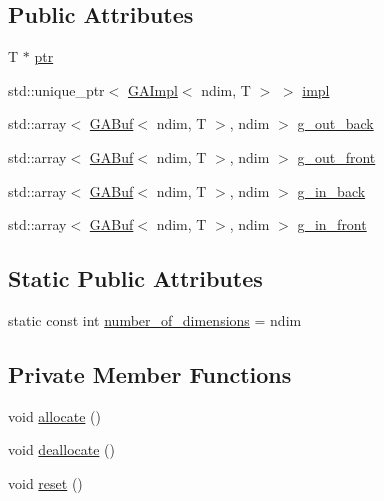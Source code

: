 \subsection*{Public Attributes}
\begin{DoxyCompactItemize}
\item 
T $\ast$ \hyperlink{classshark_1_1ndim_1_1_global_array_ad4af3b8307a3a7107186cf699b5a2432}{ptr}
\item 
std\+::unique\+\_\+ptr$<$ \hyperlink{classshark_1_1ndim_1_1_g_a_impl}{G\+A\+Impl}$<$ ndim, T $>$ $>$ \hyperlink{classshark_1_1ndim_1_1_global_array_a70684121da4badfef791c15d7076282f}{impl}
\item 
std\+::array$<$ \hyperlink{classshark_1_1ndim_1_1_g_a_buf}{G\+A\+Buf}$<$ ndim, T $>$, ndim $>$ \hyperlink{classshark_1_1ndim_1_1_global_array_a1f7c189d498d7e7c1c79d9a613d1c5a9}{g\+\_\+out\+\_\+back}
\item 
std\+::array$<$ \hyperlink{classshark_1_1ndim_1_1_g_a_buf}{G\+A\+Buf}$<$ ndim, T $>$, ndim $>$ \hyperlink{classshark_1_1ndim_1_1_global_array_ad811cd36846992d5671148e7da49bb04}{g\+\_\+out\+\_\+front}
\item 
std\+::array$<$ \hyperlink{classshark_1_1ndim_1_1_g_a_buf}{G\+A\+Buf}$<$ ndim, T $>$, ndim $>$ \hyperlink{classshark_1_1ndim_1_1_global_array_a148e8382e63e8ff0c9fece28f1131702}{g\+\_\+in\+\_\+back}
\item 
std\+::array$<$ \hyperlink{classshark_1_1ndim_1_1_g_a_buf}{G\+A\+Buf}$<$ ndim, T $>$, ndim $>$ \hyperlink{classshark_1_1ndim_1_1_global_array_a2f3fe48d925bc0c3a489b83203eaddfe}{g\+\_\+in\+\_\+front}
\end{DoxyCompactItemize}
\subsection*{Static Public Attributes}
\begin{DoxyCompactItemize}
\item 
static const int \hyperlink{classshark_1_1ndim_1_1_global_array_aa97c2cc7bef528fca0118cac8e8a5c39}{number\+\_\+of\+\_\+dimensions} = ndim
\end{DoxyCompactItemize}
\subsection*{Private Member Functions}
\begin{DoxyCompactItemize}
\item 
void \hyperlink{classshark_1_1ndim_1_1_global_array_ad7054741564c962156640415d208dc72}{allocate} ()
\item 
void \hyperlink{classshark_1_1ndim_1_1_global_array_a62353dca76c53cee5fb9cfa5f31cd542}{deallocate} ()
\item 
void \hyperlink{classshark_1_1ndim_1_1_global_array_a8f1fa6f1d6408a1b34b35a50bf551733}{reset} ()
\end{DoxyCompactItemize}
